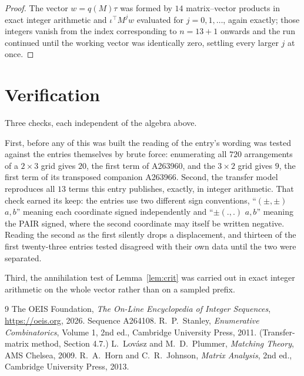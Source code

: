 \documentclass[11pt,a4paper]{article}
\theoremstyle{plain}
\theoremstyle{definition}
\begin{document}
\begin{proof}
The vector $w=q(M)\tau$ was formed by $14$ matrix--vector products in exact integer
arithmetic and $\iota^{\!\top}M^{j}w$ evaluated for $j=0,1,\dots$, again exactly; those
integers vanish from the index corresponding to $n=13+1$ onwards and the run continued
until the working vector was identically zero, settling every larger $j$ at once.
\end{proof}

\section{Verification}

Three checks, each independent of the algebra above.

First, before any of this was built the reading of the entry's wording was tested against the
entries themselves by brute force: enumerating all $720$ arrangements of a $2\times3$ grid
gives $20$, the first term of A263960, and the $3\times2$ grid gives $9$, the first term of its
transposed companion A263966. Second, the transfer model reproduces all $13$ terms this
entry publishes, exactly, in integer arithmetic. That check earned its keep: the entries use
two different sign conventions, ``$(\pm,\pm)$ $a,b$'' meaning each coordinate signed
independently and ``$\pm(.,.)$ $a,b$'' meaning the PAIR signed, where the second coordinate may
itself be written negative. Reading the second as the first silently drops a displacement, and
thirteen of the first twenty-three entries tested disagreed with their own data until the two
were separated.

Third, the annihilation test of Lemma~\ref{lem:crit} was carried out in exact integer
arithmetic on the whole vector rather than on a sampled prefix.

\begin{thebibliography}{9}
 The OEIS Foundation, \emph{The On-Line Encyclopedia of Integer
Sequences}, \url{https://oeis.org}, 2026. Sequence A264108.
 R.~P.~Stanley, \emph{Enumerative Combinatorics}, Volume 1, 2nd ed.,
Cambridge University Press, 2011. (Transfer-matrix method, Section 4.7.)
 L.~Lov\'asz and M.~D.~Plummer, \emph{Matching Theory}, AMS Chelsea, 2009.
 R.~A.~Horn and C.~R.~Johnson, \emph{Matrix Analysis}, 2nd ed., Cambridge
University Press, 2013.
\end{thebibliography}
\end{document}
